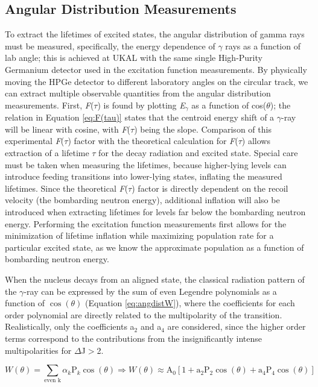 \subsection{Angular Distribution Measurements}
To extract the lifetimes of excited states, the angular distribution of gamma rays must be measured, specifically, the energy dependence of $\gamma$ rays as a function of lab angle; this is achieved at UKAL with the same single High-Purity Germanium detector used in the excitation function measurements. By physically moving the HPGe detector to different laboratory angles on the circular track, we can extract multiple observable quantities from the angular distribution measurements. First, \textit{F}(\textit{$\tau$}) is found by plotting \textit{E$_{\gamma}$} as a function of cos($\theta$); the relation in Equation \ref{eq:F(tau)} states that the centroid energy shift of a $\gamma$-ray will be linear with cosine, with \textit{F}(\textit{$\tau$}) being the slope. Comparison of this experimental \textit{F}(\textit{$\tau$}) factor with the theoretical calculation for \textit{F}(\textit{$\tau$}) allows extraction of a lifetime \textit{$\tau$} for the decay radiation and excited state. Special care must be taken when measuring the lifetimes, because higher-lying levels can introduce feeding transitions into lower-lying states, inflating the measured lifetimes. Since the theoretical \textit{F}(\textit{$\tau$}) factor is directly dependent on the recoil velocity (the bombarding neutron energy), additional inflation will also be introduced when extracting lifetimes for levels far below the bombarding neutron energy. Performing the excitation function measurements first allows for the minimization of lifetime inflation while maximizing population rate for a particular excited state, as we know the approximate population as a function of bombarding neutron energy.   

When the nucleus decays from an aligned state, the classical radiation pattern of the $\gamma$-ray can be expressed by the sum of even Legendre polynomials as a function of $\cos(\theta)$ (Equation \ref{eq:angdistW}), where the coefficients for each order polynomial are directly related to the multipolarity of the transition. Realistically, only the coefficients a$_2$ and a$_4$ are considered, since the higher order terms correspond to the contributions from the insignificantly intense multipolarities for $\Delta$J$>$2.

\begin{equation} \label{eq:angdistW}
W(\theta)=\sum_{\text{even k}}\alpha_k\text{P}_k\cos(\theta) \Rightarrow W(\theta) \approx \text{A}_0[1+\text{a}_2\text{P}_2\cos(\theta)+\text{a}_4\text{P}_4\cos(\theta)]
\end{equation}

